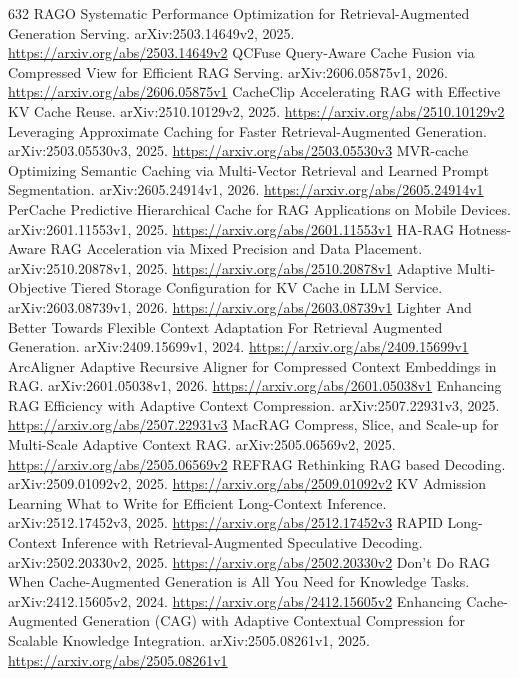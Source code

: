 \documentclass[11pt]{article}
\begin{document}
\begin{thebibliography}{632}
 RAGO Systematic Performance Optimization for Retrieval-Augmented Generation Serving. arXiv:2503.14649v2, 2025. \url{https://arxiv.org/abs/2503.14649v2}
 QCFuse Query-Aware Cache Fusion via Compressed View for Efficient RAG Serving. arXiv:2606.05875v1, 2026. \url{https://arxiv.org/abs/2606.05875v1}
 CacheClip Accelerating RAG with Effective KV Cache Reuse. arXiv:2510.10129v2, 2025. \url{https://arxiv.org/abs/2510.10129v2}
 Leveraging Approximate Caching for Faster Retrieval-Augmented Generation. arXiv:2503.05530v3, 2025. \url{https://arxiv.org/abs/2503.05530v3}
 MVR-cache Optimizing Semantic Caching via Multi-Vector Retrieval and Learned Prompt Segmentation. arXiv:2605.24914v1, 2026. \url{https://arxiv.org/abs/2605.24914v1}
 PerCache Predictive Hierarchical Cache for RAG Applications on Mobile Devices. arXiv:2601.11553v1, 2025. \url{https://arxiv.org/abs/2601.11553v1}
 HA-RAG Hotness-Aware RAG Acceleration via Mixed Precision and Data Placement. arXiv:2510.20878v1, 2025. \url{https://arxiv.org/abs/2510.20878v1}
 Adaptive Multi-Objective Tiered Storage Configuration for KV Cache in LLM Service. arXiv:2603.08739v1, 2026. \url{https://arxiv.org/abs/2603.08739v1}
 Lighter And Better Towards Flexible Context Adaptation For Retrieval Augmented Generation. arXiv:2409.15699v1, 2024. \url{https://arxiv.org/abs/2409.15699v1}
 ArcAligner Adaptive Recursive Aligner for Compressed Context Embeddings in RAG. arXiv:2601.05038v1, 2026. \url{https://arxiv.org/abs/2601.05038v1}
 Enhancing RAG Efficiency with Adaptive Context Compression. arXiv:2507.22931v3, 2025. \url{https://arxiv.org/abs/2507.22931v3}
 MacRAG Compress, Slice, and Scale-up for Multi-Scale Adaptive Context RAG. arXiv:2505.06569v2, 2025. \url{https://arxiv.org/abs/2505.06569v2}
 REFRAG Rethinking RAG based Decoding. arXiv:2509.01092v2, 2025. \url{https://arxiv.org/abs/2509.01092v2}
 KV Admission Learning What to Write for Efficient Long-Context Inference. arXiv:2512.17452v3, 2025. \url{https://arxiv.org/abs/2512.17452v3}
 RAPID Long-Context Inference with Retrieval-Augmented Speculative Decoding. arXiv:2502.20330v2, 2025. \url{https://arxiv.org/abs/2502.20330v2}
 Don't Do RAG When Cache-Augmented Generation is All You Need for Knowledge Tasks. arXiv:2412.15605v2, 2024. \url{https://arxiv.org/abs/2412.15605v2}
 Enhancing Cache-Augmented Generation (CAG) with Adaptive Contextual Compression for Scalable Knowledge Integration. arXiv:2505.08261v1, 2025. \url{https://arxiv.org/abs/2505.08261v1}

\end{thebibliography}
\end{document}
